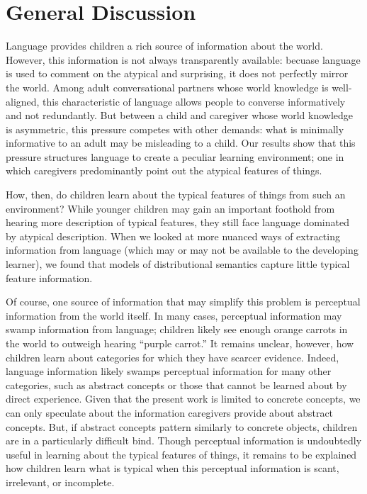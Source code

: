 \documentclass[10pt, letterpaper]{article}
\begin{document}
\hypertarget{general-discussion}{%
\section{General Discussion}\label{general-discussion}}

Language provides children a rich source of information about the world.
However, this information is not always transparently available: becuase
language is used to comment on the atypical and surprising, it does not
perfectly mirror the world. Among adult conversational partners whose
world knowledge is well-aligned, this characteristic of language allows
people to converse informatively and not redundantly. But between a
child and caregiver whose world knowledge is asymmetric, this pressure
competes with other demands: what is minimally informative to an adult
may be misleading to a child. Our results show that this pressure
structures language to create a peculiar learning environment; one in
which caregivers predominantly point out the atypical features of
things.

How, then, do children learn about the typical features of things from
such an environment? While younger children may gain an important
foothold from hearing more description of typical features, they still
face language dominated by atypical description. When we looked at more
nuanced ways of extracting information from language (which may or may
not be available to the developing learner), we found that models of
distributional semantics capture little typical feature information.

Of course, one source of information that may simplify this problem is
perceptual information from the world itself. In many cases, perceptual
information may swamp information from language; children likely see
enough orange carrots in the world to outweigh hearing ``purple
carrot.'' It remains unclear, however, how children learn about
categories for which they have scarcer evidence. Indeed, language
information likely swamps perceptual information for many other
categories, such as abstract concepts or those that cannot be learned
about by direct experience. Given that the present work is limited to
concrete concepts, we can only speculate about the information
caregivers provide about abstract concepts. But, if abstract concepts
pattern similarly to concrete objects, children are in a particularly
difficult bind. Though perceptual information is undoubtedly useful in
learning about the typical features of things, it remains to be
explained how children learn what is typical when this perceptual
information is scant, irrelevant, or incomplete.
\end{document}
